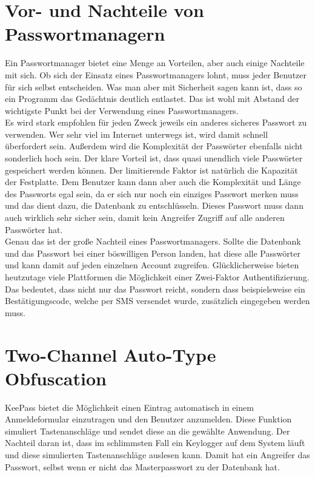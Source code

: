 \documentclass[12pt,a4paper]{scrreprt}
\begin{document}
\section{Vor- und Nachteile von Passwortmanagern}
Ein Passwortmanager bietet eine Menge an Vorteilen, aber auch einige Nachteile mit sich. Ob sich der Einsatz eines Passwortmanagers lohnt, muss jeder Benutzer für sich selbst entscheiden. Was man aber mit Sicherheit sagen kann ist, dass so ein Programm das Gedächtnis deutlich entlastet. Das ist wohl mit Abstand der wichtigste Punkt bei der Verwendung eines Passwortmanagers.\\

\noindent Es wird stark empfohlen für jeden Zweck jeweils ein anderes sicheres Passwort zu verwenden. Wer sehr viel im Internet unterwegs ist, wird damit schnell überfordert sein. Außerdem wird die Komplexität der Passwörter ebenfalls nicht sonderlich hoch sein. Der klare Vorteil ist, dass quasi unendlich viele Passwörter gespeichert werden können. Der limitierende Faktor ist natürlich die Kapazität der Festplatte. Dem Benutzer kann dann aber auch die Komplexität und Länge des Passworts egal sein, da er sich nur noch ein einziges Passwort merken muss und das dient dazu, die Datenbank zu entschlüsseln. Dieses Passwort muss dann auch wirklich sehr sicher sein, damit kein Angreifer Zugriff auf alle anderen Passwörter hat.\\

\noindent Genau das ist der große Nachteil eines Passwortmanagers. Sollte die Datenbank und das Passwort bei einer böswilligen Person landen, hat diese alle Passwörter und kann damit auf jeden einzelnen Account zugreifen. Glücklicherweise bieten heutzutage viele Plattformen die Möglichkeit einer Zwei-Faktor Authentifizierung. Das bedeutet, dass nicht nur das Passwort reicht, sondern dass beispielsweise ein Bestätigungscode, welche per SMS versendet wurde, zusätzlich eingegeben werden muss.

\section{Two-Channel Auto-Type Obfuscation}
KeePass bietet die Möglichkeit einen Eintrag automatisch in einem Anmeldeformular einzutragen und den Benutzer anzumelden. Diese Funktion simuliert Tastenanschläge und sendet diese an die gewählte Anwendung. Der Nachteil daran ist, dass im schlimmsten Fall ein Keylogger auf dem System läuft und diese simulierten Tastenanschläge auslesen kann. Damit hat ein Angreifer das Passwort, selbst wenn er nicht das Masterpasswort zu der Datenbank hat.\\
\end{document}
